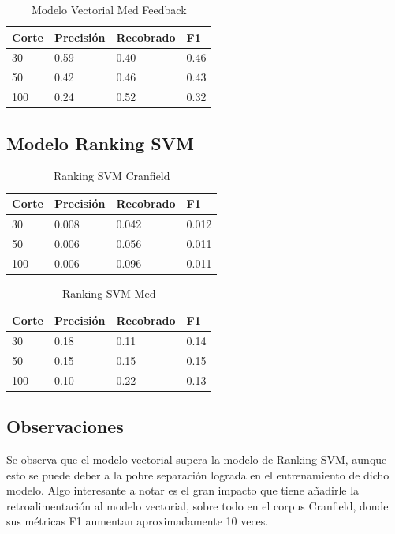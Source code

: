 \documentclass[runningheads]{llncs}
\begin{document}
\begin{table}
	\caption{Modelo Vectorial Med Feedback}\label{med_vec_feed_result}
 \begin{tabular}{|l|l|l|l|}
 \hline
 	Corte &  Precisión & Recobrado & F1\\
 \hline
	30 & 0.59 & 0.40 & 0.46\\
	50 & 0.42 & 0.46 & 0.43\\
	100 & 0.24 & 0.52 & 0.32\\
 \hline
 \end{tabular}
\end{table}

\newpage

\subsection{Modelo Ranking SVM}


\begin{table}
	\caption{Ranking SVM Cranfield}\label{cran_svm_result}
 \begin{tabular}{|l|l|l|l|}
 \hline
 	Corte &  Precisión & Recobrado & F1\\
 \hline
	30 & 0.008 & 0.042 & 0.012\\
	50 & 0.006 & 0.056 & 0.011\\
	100 & 0.006 & 0.096 & 0.011\\
 \hline
 \end{tabular}
\end{table}


\begin{table}
	\caption{Ranking SVM Med}\label{med_svm_result}
 \begin{tabular}{|l|l|l|l|}
 \hline
 	Corte &  Precisión & Recobrado & F1\\
 \hline
	30 & 0.18 & 0.11 & 0.14\\
	50 & 0.15 & 0.15 & 0.15\\
	100 & 0.10 & 0.22 & 0.13\\
 \hline
 \end{tabular}
\end{table}

\subsection{Observaciones}

Se observa que el modelo vectorial supera la modelo de Ranking SVM, aunque esto se puede deber a 
la pobre separación lograda en el entrenamiento de dicho modelo. Algo interesante a notar es el gran 
impacto que tiene añadirle la retroalimentación al modelo vectorial, sobre todo en el corpus Cranfield, 
donde sus métricas F1 aumentan aproximadamente 10 veces.
\end{document}
